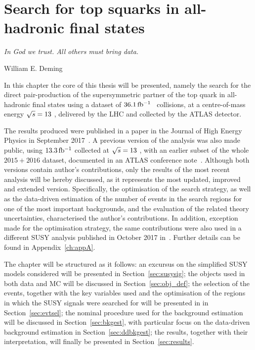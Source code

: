 \chapter[Search for top squarks in all-hadronic final states]{Search for top squarks in all-hadronic final states}
\label{ch:stop_ana}
\epigraph{\emph{In God we trust. All others must bring data.}}{William E. Deming}

	In this chapter the core of this thesis will be presented, namely the search for the direct pair-production of the supersymmetric partner of the top quark in all-hadronic final states using a dataset of $36.1\, \mbox{fb$^{-1}$}$ \pp\ collisions, at a centre-of-mass energy $\sqrt{s} = 13$ \TeV, delivered by the \ac{LHC} and collected by the \ac{ATLAS} detector. %
		
	The results produced were published in a paper in the Journal of High Energy Physics in September 2017~\cite{stop0L}. A previous version of the analysis was also made public, using $13.3\,\mbox{fb$^{-1}$}$ collected at $\sqrt{s} = 13$ \TeV, with an earlier subset of the whole $2015+2016$ dataset, documented in an ATLAS conference note~\cite{ICHEPstop0L}. Although both versions contain author's contributions, only the results of the most recent analysis will be hereby discussed, as it represents the most updated, improved and extended version. Specifically, the optimisation of the search strategy, as well as the data-driven estimation of the number of events in the search regions for one of the most important backgrounds, and the evaluation of the related theory uncertainties, characterised the author's contributions. In addition, exception made for the optimisation strategy, the same contributions were also used in a different \ac{SUSY} analysis published in October 2017 in~\cite{DMhf}. Further details can be found in Appendix~\ref{ch:appA}.

	The chapter will be structured as it follows: an excursus on the simplified \ac{SUSY} models considered will be presented in Section~\ref{sec:susysig}; the objects used in both data and \ac{MC} will be discussed in Section~\ref{sec:obj_def}; the selection of the events, together with the key variables used and the optimisation of the regions in which the \ac{SUSY} signals were searched for will be presented in in Section~\ref{sec:evtsel}; the nominal procedure used for the background estimation will be discussed in Section~\ref{sec:bkgest}, with particular focus on the data-driven background estimation in Section~\ref{sec:ddbkgest}; the results, together with their interpretation, will finally be presented in Section~\ref{sec:results}.


